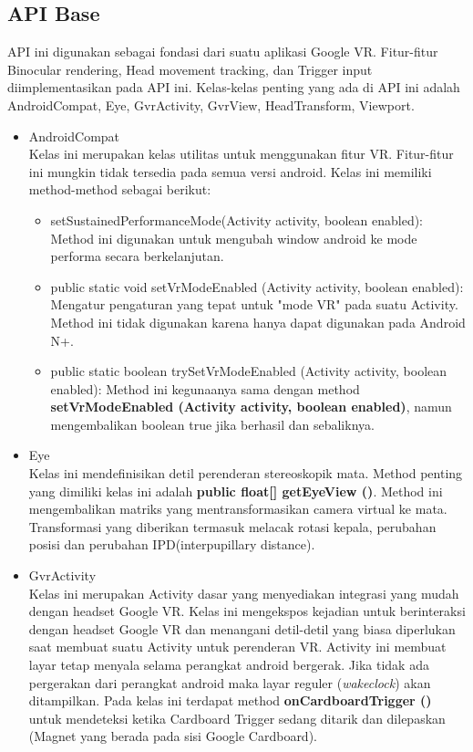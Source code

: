 \subsection{API Base}
\label{sec:api_base}
API ini digunakan sebagai fondasi dari suatu aplikasi Google VR. Fitur-fitur Binocular rendering, Head movement tracking, dan Trigger input diimplementasikan pada API ini. Kelas-kelas penting yang ada di API ini adalah AndroidCompat, Eye, GvrActivity, GvrView, HeadTransform, Viewport.
\begin{itemize}
	\item AndroidCompat\\
Kelas ini merupakan kelas utilitas untuk menggunakan fitur VR. Fitur-fitur ini mungkin tidak tersedia pada semua versi android. Kelas ini memiliki method-method sebagai berikut:
\begin{itemize}
	\item setSustainedPerformanceMode(Activity activity, boolean enabled): \\
	Method ini digunakan untuk mengubah window android ke mode performa secara berkelanjutan.
	\item public static void setVrModeEnabled (Activity activity, boolean enabled): \\
	Mengatur pengaturan yang tepat untuk "mode VR" pada suatu Activity. Method ini tidak digunakan karena hanya dapat digunakan pada Android N+.
	\item public static boolean trySetVrModeEnabled (Activity activity, boolean enabled): 
	Method ini kegunaanya sama dengan method \textbf{setVrModeEnabled (Activity activity, boolean enabled)}, namun mengembalikan boolean true jika berhasil dan sebaliknya.
\end{itemize}
	\item Eye\\
Kelas ini mendefinisikan detil perenderan stereoskopik mata. Method penting yang dimiliki kelas ini adalah \textbf{public float[] getEyeView ()}. Method ini mengembalikan matriks yang mentransformasikan camera virtual ke mata. Transformasi yang diberikan termasuk melacak rotasi kepala, perubahan posisi dan perubahan IPD(interpupillary distance).
	\item GvrActivity\\
Kelas ini merupakan Activity dasar yang menyediakan integrasi yang mudah dengan headset Google VR. Kelas ini mengekspos kejadian untuk berinteraksi dengan headset Google VR dan menangani detil-detil yang biasa diperlukan saat membuat suatu Activity untuk perenderan VR. Activity ini membuat layar tetap menyala selama perangkat android bergerak. Jika tidak ada pergerakan dari perangkat android maka layar reguler (\textit{wakeclock}) akan ditampilkan. Pada kelas ini terdapat method \textbf{onCardboardTrigger ()} untuk mendeteksi ketika Cardboard Trigger sedang ditarik dan dilepaskan (Magnet yang berada pada sisi Google Cardboard).

\end{itemize}

